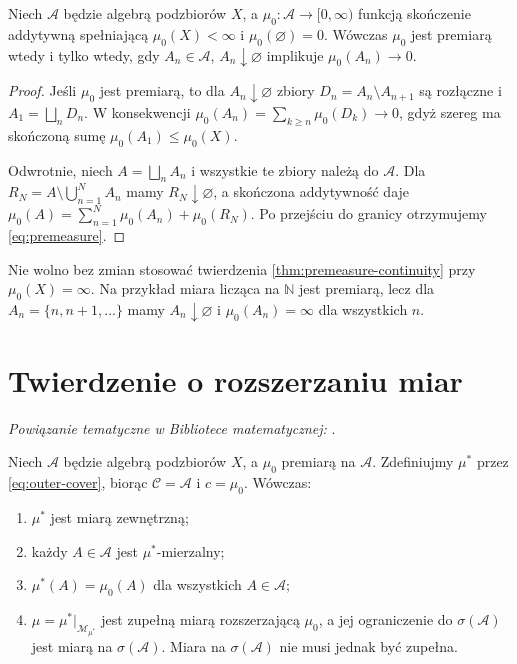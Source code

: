 \begin{twierdzenie}
\label{thm:premeasure-continuity}
Niech $\mathcal A$ będzie algebrą podzbiorów $X$, a
$\mu_0:\mathcal A\to[0,\infty)$ funkcją skończenie addytywną
spełniającą $\mu_0(X)<\infty$ i $\mu_0(\varnothing)=0$.
Wówczas $\mu_0$ jest premiarą wtedy i tylko wtedy, gdy
$A_n\in\mathcal A$, $A_n\downarrow\varnothing$ implikuje
$\mu_0(A_n)\to0$.
\end{twierdzenie}

\begin{proof}
Jeśli $\mu_0$ jest premiarą, to dla
$A_n\downarrow\varnothing$ zbiory $D_n=A_n\setminus A_{n+1}$
są rozłączne i $A_1=\bigsqcup_nD_n$.
W konsekwencji
$\mu_0(A_n)=\sum_{k\ge n}\mu_0(D_k)\to0$,
gdyż szereg ma skończoną sumę $\mu_0(A_1)\le\mu_0(X)$.

Odwrotnie, niech $A=\bigsqcup_n A_n$ i wszystkie te zbiory
należą do $\mathcal A$. Dla
$R_N=A\setminus\bigcup_{n=1}^N A_n$ mamy
$R_N\downarrow\varnothing$, a skończona addytywność daje
$\mu_0(A)=\sum_{n=1}^N\mu_0(A_n)+\mu_0(R_N)$.
Po przejściu do granicy otrzymujemy \eqref{eq:premeasure}.
\end{proof}

\begin{uwaga}
Nie wolno bez zmian stosować twierdzenia
\ref{thm:premeasure-continuity} przy $\mu_0(X)=\infty$.
Na przykład miara licząca na $\mathbb N$ jest premiarą,
lecz dla $A_n=\{n,n+1,\ldots\}$ mamy $A_n\downarrow\varnothing$
i $\mu_0(A_n)=\infty$ dla wszystkich $n$.
\end{uwaga}

\section{Twierdzenie o rozszerzaniu miar}

\noindent\emph{Powiązanie tematyczne w Bibliotece matematycznej:} .


\begin{twierdzenie}
\label{thm:extension-caratheodory}
Niech $\mathcal A$ będzie algebrą podzbiorów $X$, a
$\mu_0$ premiarą na $\mathcal A$. Zdefiniujmy $\mu^*$
przez \eqref{eq:outer-cover}, biorąc $\mathcal C=\mathcal A$
i $c=\mu_0$. Wówczas:
\begin{enumerate}[label=\textup{(\roman*)}]
\item $\mu^*$ jest miarą zewnętrzną;
\item każdy $A\in\mathcal A$ jest $\mu^*$-mierzalny;
\item $\mu^*(A)=\mu_0(A)$ dla wszystkich $A\in\mathcal A$;
\item $\mu=\mu^*|_{\mathcal M_{\mu^*}}$ jest zupełną miarą
rozszerzającą $\mu_0$, a jej ograniczenie do
$\sigma(\mathcal A)$ jest miarą na $\sigma(\mathcal A)$.
Miara na $\sigma(\mathcal A)$ nie musi jednak być zupełna.
\end{enumerate}
\end{twierdzenie}

